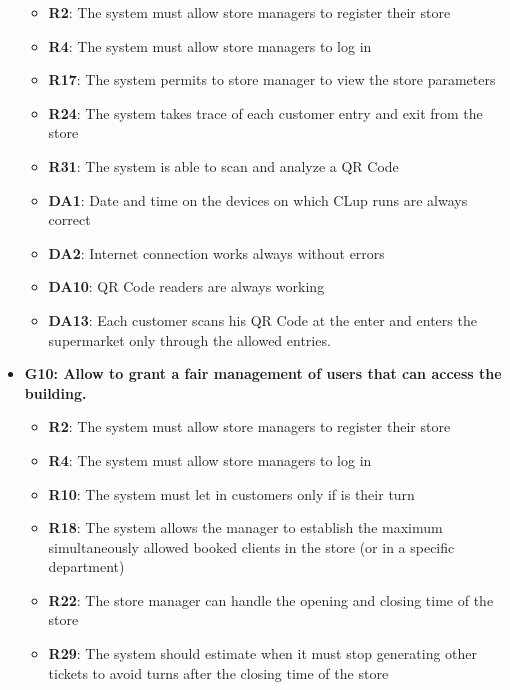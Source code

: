 \documentclass{article}
\begin{document}
\begin{itemize}
					\begin{itemize}
						
						\item {\bfseries R2}: The system must allow store managers to register their store
						\item {\bfseries R4}: The system must allow store managers to log in
						\item {\bfseries R17}: The system permits to store manager to view the store parameters
						\item {\bfseries R24}: The system takes trace of each customer entry and exit from the store
						\item {\bfseries R31}: The system is able to scan and analyze a QR Code \\		
				
						\item {\bfseries DA1}: Date and time on the devices on which CLup runs are always correct
						\item {\bfseries DA2}: Internet connection works always without errors
						\item {\bfseries DA10}: QR Code readers are always working
						\item {\bfseries DA13}: Each customer scans his QR Code at the enter and enters the supermarket only through the allowed entries.
							
					\end{itemize}

				\item {\bfseries G10: Allow to grant a fair management of users that can access the building.}	

					\begin{itemize}
						
						\item {\bfseries R2}: The system must allow store managers to register their store
						\item {\bfseries R4}: The system must allow store managers to log in
						\item {\bfseries R10}: The system must let in customers only if is their turn
						\item {\bfseries R18}: The system allows the manager to establish the maximum simultaneously allowed booked clients in the store (or in a specific department)
						\item {\bfseries R22}: The store manager can handle the opening and closing time of the store
						\item {\bfseries R29}: The system should estimate when it must stop generating other tickets to avoid turns after the closing time of the store \\
						

\end{itemize}
\end{itemize}
\end{document}
